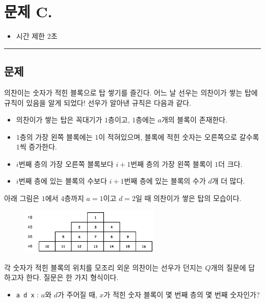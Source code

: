 \newpage
\section*{{\Large 문제 C.} }

\begin{itemize}
    \item 시간 제한 \tabto{2cm} 2초
\end{itemize}

\hrule

\subsection*{문제}

의찬이는 숫자가 적힌 블록으로 탑 쌓기를 즐긴다. 어느 날 선우는 의찬이가 쌓는 탑에 규칙이 있음을 알게 되었다! 선우가 알아낸 규칙은 다음과 같다.

\begin{itemize}
    \item 의찬이가 쌓는 탑은 꼭대기가 $1$층이고, $1$층에는 $a$개의 블록이 존재한다.
    \item $1$층의 가장 왼쪽 블록에는 $1$이 적혀있으며, 블록에 적힌 숫자는 오른쪽으로 갈수록 $1$씩 증가한다.
    \item $i$번째 층의 가장 오른쪽 블록보다 $i+1$번째 층의 가장 왼쪽 블록이 $1$더 크다.
    \item $i$번째 층에 있는 블록의 수보다 $i+1$번째 층에 있는 블록의 수가 $d$개 더 많다.
\end{itemize}

아래 그림은 $1$에서 $4$층까지 $a=1$이고 $d=2$일 때 의찬이가 쌓은 탑의 모습이다.

\begin{figure}[h]
    \centering
    \includegraphics[width=0.6\textwidth]{problems/image/sootab.png}
\end{figure}

각 숫자가 적힌 블록의 위치를 모조리 외운 의찬이는 선우가 던지는 $Q$개의 질문에 답하고자 한다. 질문은 한 가지 형식이다.

\begin{itemize}
    \item \texttt{\color{red}a d x} : $a$와 $d$가 주어질 때, $x$가 적힌 숫자 블록이 몇 번째 층의 몇 번째 숫자인가?
\end{itemize}

